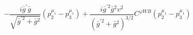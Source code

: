 %
\begin{dmath*}
%
  -  \frac{i {\bar g}^\prime {\bar g}{}}{\sqrt{{\bar g}^{\prime 2} + {\bar g}{}^2}} \left(p_2^{\mu_1} - p_3^{\mu_1}\right)  +  \frac{i {\bar g}^{\prime 2} {\bar g}{}^2 v^2}{\left({\bar g}^{\prime 2} + {\bar g}{}^2\right)^{3/2}}C^{ \varphi  WB} \left(p_2^{\mu_1} - p_3^{\mu_1}\right)
%
\end{dmath*}
%

